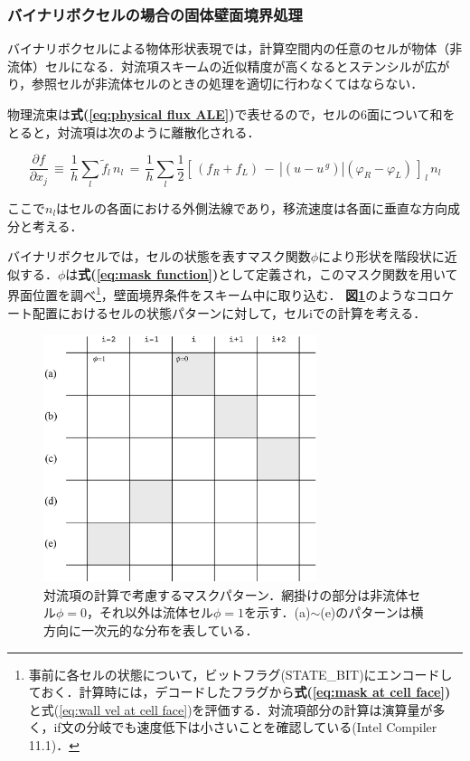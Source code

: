 %
\subsubsection{バイナリボクセルの場合の固体壁面境界処理}
バイナリボクセルによる物体形状表現では，計算空間内の任意のセルが物体（非流体）セルになる．対流項スキームの近似精度が高くなるとステンシルが広がり，参照セルが非流体セルのときの処理を適切に行わなくてはならない．

物理流束は\textbf{式(\ref{eq:physical flux ALE})}で表せるので，セルの6面について和をとると，対流項は次のように離散化される．

\begin{equation}
\frac{\partial f}{\partial x_j} \, \equiv \, \frac{1}{h} \sum  \limits_l \tilde{f}_l \,n_l 
\,=\, \frac{1}{h} \sum  \limits_l 
\frac{1}{2} { \left[ \, \left( f_R + f_L \right) \,-\, \left| (u-u^{\,g}) \right| \left( \varphi_R - \varphi_L \right) \, \right] }_{\,l} \, n_l
\label{eq:upwind approx}
\end{equation}

\noindent ここで$n_l$はセルの各面における外側法線であり，移流速度は各面に垂直な方向成分と考える．

バイナリボクセルでは，セルの状態を表すマスク関数$\phi$により形状を階段状に近似する．$\phi$は\textbf{式(\ref{eq:mask function})}として定義され，このマスク関数を用いて界面位置を調べ\footnote{事前に各セルの状態について，ビットフラグ(STATE\_BIT)にエンコードしておく．計算時には，デコードしたフラグから\textbf{式(\ref{eq:mask at cell face})}と式(\ref{eq:wall vel at cell face})を評価する．対流項部分の計算は演算量が多く，if文の分岐でも速度低下は小さいことを確認している(Intel Compiler 11.1)．}，壁面境界条件をスキーム中に取り込む\cite{akasaka:06:JSCES}．
\textbf{図\ref{fig:Mask pattern CC}}のようなコロケート配置におけるセルの状態パターンに対して，セルiでの計算を考える．

\begin{figure}[htbp]
\begin{center}
\includegraphics[width=8cm,clip]{mask_patternCC.eps}
\end{center}
\caption{対流項の計算で考慮するマスクパターン．網掛けの部分は非流体セル$\phi=0$，それ以外は流体セル$\phi=1$を示す．(a)$\sim$(e)のパターンは横方向に一次元的な分布を表している．}
\label{fig:Mask pattern CC}
\end{figure}

